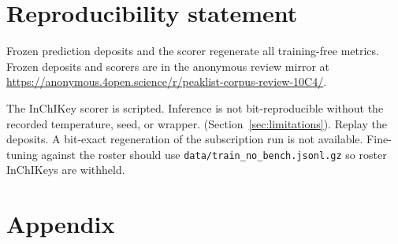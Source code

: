 \documentclass{article}
\begin{document}
\section*{Reproducibility statement}
Frozen prediction deposits and the scorer regenerate all training-free metrics.
Frozen deposits and scorers are in the anonymous review mirror at
\url{https://anonymous.4open.science/r/peaklist-corpus-review-10C4/}.

The InChIKey scorer is scripted.
Inference is not bit-reproducible without the recorded temperature, seed, or wrapper. 
 (Section~\ref{sec:limitations}).
Replay the deposits.
A bit-exact regeneration of the subscription run is not available.
Fine-tuning against the roster should use \texttt{data/train\_no\_bench.jsonl.gz}
so roster InChIKeys are withheld.




\newpage
\appendix
\section{Appendix}
\label{app:si}

\end{document}
